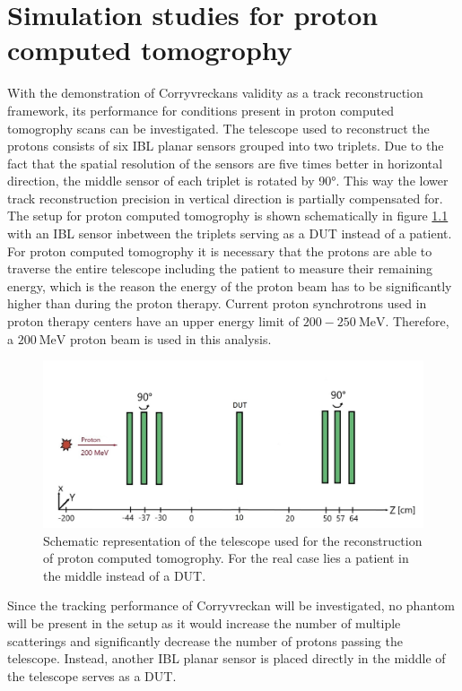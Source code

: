 \chapter{Simulation studies for proton computed tomogrophy} \label{sec:setup}
With the demonstration of Corryvreckans validity as a track reconstruction framework, its performance for conditions present
in proton computed tomogrophy scans can be investigated. The telescope used to reconstruct the protons consists of six IBL planar sensors
grouped into two triplets. Due to the fact that the spatial resolution of the sensors are five times better in horizontal direction, the middle sensor
of each triplet is rotated by 90°. This way the lower track reconstruction precision in vertical direction is partially compensated for.
The setup for proton computed tomogrophy is shown schematically in figure \ref{fig:phantom} with an IBL sensor inbetween the triplets serving as a DUT instead of a patient. \\
For proton computed tomogrophy it is necessary that the protons are able to traverse the entire telescope including the patient
to measure their remaining energy, which is the reason the energy of the proton beam has to be significantly higher than during
the proton therapy. Current proton synchrotrons used in proton therapy centers have an upper energy limit of $200 - \SI{250}{\mega\eV}$.
Therefore, a $\SI{200}{\mega\eV}$ proton beam is used in this analysis.

\begin{figure}
  \centering
  \includegraphics[height=0.45\textwidth]{images/phantom_proton_4.jpg}
  \caption{Schematic representation of the telescope used for the reconstruction of proton computed tomogrophy. For the real
  case lies a patient in the middle instead of a DUT.}
  \label{fig:phantom}
\end{figure}

Since the tracking performance of Corryvreckan will be investigated, no
phantom will be present in the setup as it would
increase the number of multiple scatterings and significantly decrease the number of protons passing the telescope. Instead, another
IBL planar sensor is placed directly in the middle of the telescope serves as a DUT.

